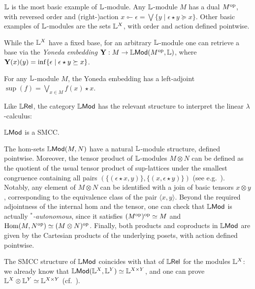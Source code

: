 $\mathbb{L}$ is the most basic example of $\mathbb{L}$-module.
Any $\mathbb{L}$-module $M$ has a dual $M^{\mathrm{op}}$, with reversed order and (right-)action $x\multimapinv \epsilon= \bigvee\{y\mid \epsilon \star y\succeq x\}$.
 Other basic examples of $\mathbb{L}$-modules are the sets $\mathbb{L}^{X}$, with order and action defined pointwise. 
 
 
 While the $\mathbb{L}^{X}$ have a fixed base, for an arbitrary $\mathbb{L}$-module one can retrieve a base via the \emph{Yoneda embedding}
$\mathbf{Y}: M \to \mathbb{L}\mathsf{Mod}(M^{\mathrm{op}},\mathbb{L})$, where $\mathbf{Y}(x)(y)=\inf\{\epsilon\mid \epsilon\star y\succeq x\}$. 


\begin{proposition}\label{prop:yonemod}
For any $\mathbb{L}$-module $M$, the Yoneda embedding has a left-adjoint $\sup(f)=\bigvee_{x\in M}f(x)\star x$.
\end{proposition}


Like $\mathbb{L} \mathsf{Rel}$, the category $\mathbb{L}\mathsf{Mod}$ has the relevant structure to interpret the linear $\lambda$-calculus:
\begin{proposition}
$\mathbb{L}\mathsf{Mod}$ is a SMCC.
\end{proposition}
The hom-sets $\mathbb{L}\mathsf{Mod}(M,N)$ have a natural $\mathbb{L}$-module structure, defined pointwise. Moreover, the tensor product of $\mathbb{L}$-modules $M\otimes N$ can be defined as the quotient of the usual tensor product of sup-lattices under the smallest congruence containing all pairs $(\{(\epsilon \star x,y)\},\{(x,\epsilon\star y)\})$ (see e.g.~\cite{Russo2007}).
Notably, any element of $M\otimes N$ can be identified with a join of basic tensors $x\otimes y$, corresponding to the equivalence class of the pair $\langle x,y\rangle$.
Beyond the required adjointness of the internal hom and the tensor, one can check that $\mathbb{L}\mathsf{Mod}$ is actually \emph{$^{*}$-autonomous}, since it satisfies $(M^{\mathrm{op}})^{\mathrm{op}}\simeq M$ and 
$\mathrm{Hom}(M,N^{\mathrm{op}})\simeq (M\otimes N)^{\mathrm{op}}$.
Finally, both products and coproducts in $\mathbb{L}\mathsf{Mod}$ are given by the Cartesian products of the underlying posets, with action defined pointwise.
%


\begin{remark}
The SMCC structure of $\mathbb{L}\mathsf{Mod}$ coincides with that of $\mathbb{L} \mathsf{Rel}$ for the modules $\mathbb{L}^{X}$: we already know that $\mathbb{L}\mathsf{Mod}(\mathbb{L}^{X},\mathbb{L}^{Y})\simeq \mathbb{L}^{X\times Y} $, and 
one can prove $\mathbb{L}^{X}\otimes \mathbb{L}^{Y}\simeq \mathbb{L}^{X\times Y} $ (cf.~\cite{Russo2007}).%
\end{remark}



